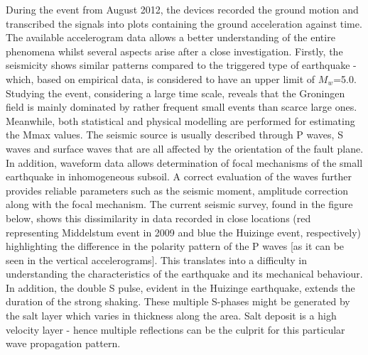 \documentclass[10pt,a4paper]{report}
\begin{document}
During the event from August 2012, the devices recorded the ground motion and transcribed the signals into plots containing the ground acceleration against time. The available accelerogram data allows a better understanding of the entire phenomena whilst several aspects arise after a close investigation. Firstly, the seismicity shows similar patterns compared to the triggered type of earthquake - which, based on empirical data, is considered to have an upper limit of $M_w$=5.0. Studying the event, considering a large time scale, reveals that the Groningen field is mainly dominated by rather frequent small events than scarce large ones. Meanwhile, both statistical and physical modelling are performed for estimating the Mmax values.
The seismic source is usually described through P waves, S waves and surface waves that are all affected by the orientation of the fault plane. In addition, waveform data allows determination of focal mechanisms of the small earthquake in inhomogeneous subsoil. A correct evaluation of the waves further provides reliable parameters such as the seismic moment, amplitude correction along with the focal mechanism. The current seismic survey, found in the figure below, shows this dissimilarity in data recorded in close locations (red representing Middelstum event in 2009 and blue the Huizinge event, respectively) highlighting the difference in the polarity pattern of the P waves [as it can be seen in the vertical accelerograms]. This translates into a difficulty in understanding  the characteristics of the earthquake and its mechanical behaviour. In addition, the double S pulse, evident in the Huizinge earthquake, extends the duration of the strong shaking. These multiple S-phases might be generated by the salt layer which varies in thickness along the area. Salt deposit is a high velocity layer - hence multiple reflections can be the culprit for this particular wave propagation pattern. 
\end{document}
